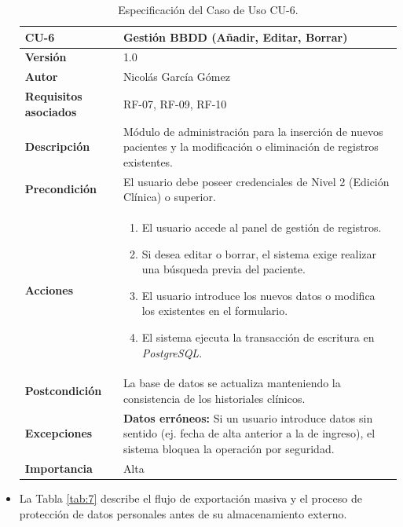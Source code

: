 \begin{itemize}
\begin{table}[hbt!]	\centering
	\begin{tabularx}{\linewidth}{ p{} p{} }
		\toprule
		\textbf{CU-6}    & \textbf{Gestión BBDD (Añadir, Editar, Borrar)}\\
		\toprule
		\textbf{Versión}              & 1.0    \\
		\textbf{Autor}                & Nicolás García Gómez \\
		\textbf{Requisitos asociados} & RF-07, RF-09, RF-10 \\
		\textbf{Descripción}          & Módulo de administración para la inserción de nuevos pacientes y la modificación o eliminación de registros existentes. \\
		\textbf{Precondición}         & El usuario debe poseer credenciales de Nivel 2 (Edición Clínica) o superior. \\
		\textbf{Acciones}             &
		\begin{enumerate}
			\def\labelenumi{\arabic{enumi}.}
			\item El usuario accede al panel de gestión de registros.
			\item Si desea editar o borrar, el sistema exige realizar una búsqueda previa del paciente.
			\item El usuario introduce los nuevos datos o modifica los existentes en el formulario.
			\item El sistema ejecuta la transacción de escritura en \textit{PostgreSQL}.
		\end{enumerate}\\
		\textbf{Postcondición}        & La base de datos se actualiza manteniendo la consistencia de los historiales clínicos. \\
		\textbf{Excepciones}          & \textbf{Datos erróneos:} Si un usuario introduce datos sin sentido (ej. fecha de alta anterior a la de ingreso), el sistema bloquea la operación por seguridad. \\
		\textbf{Importancia}          & Alta \\
		\bottomrule
	\end{tabularx}
	\caption{Especificación del Caso de Uso CU-6.}
	\label{tab:6}
\end{table}	

	\item La Tabla \ref{tab:7} describe el flujo de exportación masiva y el proceso de protección de datos personales antes de su almacenamiento externo.
	

\end{itemize}
